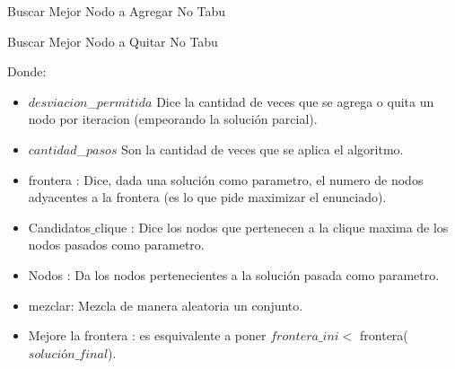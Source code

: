\begin{algorithm}[H]
    \SetAlgoLined
    \caption{Buscar Mejor Nodo a Agregar No Tabu}


\end{algorithm}

\begin{algorithm}[H]
    \SetAlgoLined
    \caption{Buscar Mejor Nodo a Quitar No Tabu}


\end{algorithm}

Donde:
\begin{itemize}
 \item $desviacion$\_$permitida$ Dice la cantidad de veces que se agrega o quita un nodo por iteracion (empeorando la solución parcial).
 \item $cantidad$\_$pasos$ Son la cantidad de veces que se aplica el algoritmo.
 \item frontera : Dice, dada una solución como parametro, el numero de nodos adyacentes a la frontera (es lo que pide maximizar el enunciado).
 \item Candidatos$\_$clique : Dice los nodos que pertenecen a la clique maxima de los nodos pasados como parametro.
 \item Nodos : Da los nodos pertenecientes a la solución pasada como parametro.
 \item mezclar: Mezcla de manera aleatoria un conjunto.
 \item Mejore la frontera : es esquivalente a poner $frontera\_ini <$ frontera($solución\_final$).
\end{itemize}

